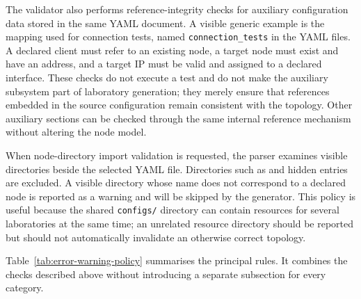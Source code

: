The validator also performs reference-integrity checks for auxiliary
configuration data stored in the same YAML document. A visible generic example
is the mapping used for connection tests, named \texttt{connection\_tests} in
the YAML files. A declared client must refer to an existing node, a target node
must exist and have an address, and a target IP must be valid and assigned to a
declared interface. These checks do not execute a test and do not make the
auxiliary subsystem part of laboratory generation; they merely ensure that
references embedded in the source configuration remain consistent with the
topology. Other auxiliary sections can be checked through the same internal
reference mechanism without altering the node model.

When node-directory import validation is requested, the parser examines
visible directories beside the selected YAML file. Directories such as
 and hidden entries are excluded. A visible directory whose
name does not correspond to a declared node is reported as a warning and will
be skipped by the generator. This policy is useful because the shared
\texttt{configs/} directory can contain resources for several laboratories at
the same time; an unrelated resource directory should be reported but should
not automatically invalidate an otherwise correct topology.

Table~\ref{tab:error-warning-policy} summarises the principal rules. It
combines the checks described above without introducing a separate subsection
for every category.

